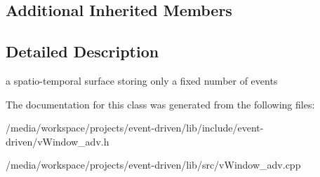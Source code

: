 \subsection*{Additional Inherited Members}


\subsection{Detailed Description}
a spatio-\/temporal surface storing only a fixed number of events 

The documentation for this class was generated from the following files\+:\begin{DoxyCompactItemize}
\item 
/media/workspace/projects/event-\/driven/lib/include/event-\/driven/v\+Window\+\_\+adv.\+h\item 
/media/workspace/projects/event-\/driven/lib/src/v\+Window\+\_\+adv.\+cpp\end{DoxyCompactItemize}
